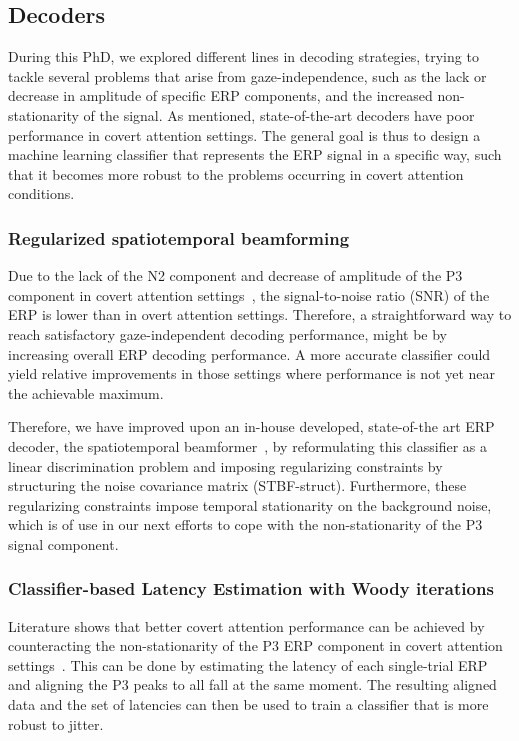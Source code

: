 \subsection{Decoders}

During this PhD, we explored different lines in decoding strategies,
trying to tackle several problems that arise from gaze-independence, such as
the lack or decrease in amplitude of specific ERP components, and the increased
non-stationarity of the signal.
As mentioned, state-of-the-art decoders have poor performance in covert attention
settings.
The general goal is thus to design a machine learning classifier that represents
the ERP signal in a specific way, such that it becomes more robust to the problems
occurring in covert attention conditions.

\subsubsection{Regularized spatiotemporal beamforming}
Due to the lack of the N2 component and decrease of amplitude of the
P3 component in covert attention
settings~\cite{Treder2010}, the signal-to-noise ratio (SNR) of
the ERP is lower than in overt attention settings.
Therefore, a straightforward way to reach satisfactory
gaze-independent decoding performance, might be by increasing overall ERP
decoding performance. A more accurate classifier could yield relative
improvements in those settings where performance is not yet near the achievable
maximum.

Therefore, we have improved upon an in-house developed, state-of-the art ERP
decoder, the spatiotemporal beamformer~\cite{Wittevrongel2016}, by reformulating
this classifier as a linear discrimination problem and
imposing regularizing constraints by structuring the noise covariance matrix
(STBF-struct).
Furthermore, these regularizing constraints impose temporal stationarity on
the background noise, which is of use in our next efforts to cope with the
non-stationarity of the P3 signal component.

\subsubsection{Classifier-based Latency Estimation with Woody iterations}
Literature shows that better covert attention performance can be achieved by
counteracting the non-stationarity of the P3 ERP component in covert
attention settings~\cite{Arico2014}.
This can be done by estimating the latency of each single-trial ERP and aligning
the P3 peaks to all fall at the same moment.
The resulting aligned data and the set of latencies can then be used to train a
classifier that is more robust to jitter.

